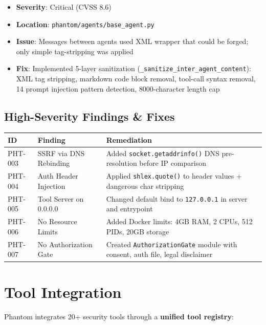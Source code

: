 \documentclass[12pt,a4paper]{article}
\begin{document}
\begin{itemize}[nosep]
    \item \textbf{Severity}: Critical (CVSS 8.6)
    \item \textbf{Location}: \texttt{phantom/agents/base\_agent.py}
    \item \textbf{Issue}: Messages between agents used XML wrapper that could
          be forged; only simple tag-stripping was applied
    \item \textbf{Fix}: Implemented 5-layer sanitization
          (\texttt{\_sanitize\_inter\_agent\_content}): XML tag stripping,
          markdown code block removal, tool-call syntax removal, 14 prompt
          injection pattern detection, 8000-character length cap
\end{itemize}

\subsection{High-Severity Findings \& Fixes}

\begin{longtable}{p{1.5cm}p{3.5cm}p{8cm}}
\toprule
\textbf{ID} & \textbf{Finding} & \textbf{Remediation} \\
\midrule
\endhead
PHT-003 & SSRF via DNS Rebinding & Added \texttt{socket.getaddrinfo()} DNS pre-resolution before IP comparison \\
PHT-004 & Auth Header Injection & Applied \texttt{shlex.quote()} to header values + dangerous char stripping \\
PHT-005 & Tool Server on 0.0.0.0 & Changed default bind to \texttt{127.0.0.1} in server and entrypoint \\
PHT-006 & No Resource Limits & Added Docker limits: 4GB RAM, 2 CPUs, 512 PIDs, 20GB storage \\
PHT-007 & No Authorization Gate & Created \texttt{AuthorizationGate} module with consent, auth file, legal disclaimer \\
\bottomrule
\end{longtable}

\section{Tool Integration}

Phantom integrates 20+ security tools through a \textbf{unified tool registry}:
\end{document}
